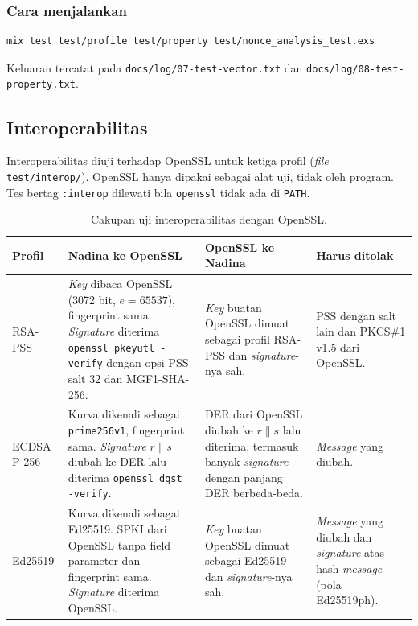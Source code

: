 \subsubsection*{Cara menjalankan}
\begin{lstlisting}[language=bash,numbers=none]
mix test test/profile test/property test/nonce_analysis_test.exs
\end{lstlisting}

Keluaran tercatat pada \texttt{docs/log/07-test-vector.txt} dan \texttt{docs/log/08-test-property.txt}.

\subsection{Interoperabilitas}

Interoperabilitas diuji terhadap OpenSSL untuk ketiga profil (\textit{file}
\texttt{test/interop/}). OpenSSL hanya dipakai sebagai alat uji, tidak oleh program. Tes
bertag \texttt{:interop} dilewati bila \texttt{openssl} tidak ada di \texttt{PATH}.

\begin{table}[H]
\centering
\small
\begin{tabular}{@{}p{2.6cm}p{4cm}p{4cm}p{3.4cm}@{}}
\toprule
Profil & Nadina ke OpenSSL & OpenSSL ke Nadina & Harus ditolak \\
\midrule
RSA-PSS &
  \textit{Key} dibaca OpenSSL (3072 bit, $e = 65537$), fingerprint sama. \textit{Signature} diterima
  \texttt{openssl pkeyutl -verify} dengan opsi PSS salt 32 dan MGF1-SHA-256. &
  \textit{Key} buatan OpenSSL dimuat sebagai profil RSA-PSS dan \textit{signature}-nya sah. &
  PSS dengan salt lain dan PKCS\#1 v1.5 dari OpenSSL. \\
\addlinespace
ECDSA P-256 &
  Kurva dikenali sebagai \texttt{prime256v1}, fingerprint sama. \textit{Signature} $r\|s$ diubah
  ke DER lalu diterima \texttt{openssl dgst -verify}. &
  DER dari OpenSSL diubah ke $r\|s$ lalu diterima, termasuk banyak \textit{signature} dengan
  panjang DER berbeda-beda. &
  \textit{Message} yang diubah. \\
\addlinespace
Ed25519 &
  Kurva dikenali sebagai Ed25519. SPKI dari OpenSSL tanpa field parameter dan fingerprint
  sama. \textit{Signature} diterima OpenSSL. &
  \textit{Key} buatan OpenSSL dimuat sebagai Ed25519 dan \textit{signature}-nya sah. &
  \textit{Message} yang diubah dan \textit{signature} atas hash \textit{message} (pola Ed25519ph). \\
\bottomrule
\end{tabular}
\caption{Cakupan uji interoperabilitas dengan OpenSSL.}
\end{table}

